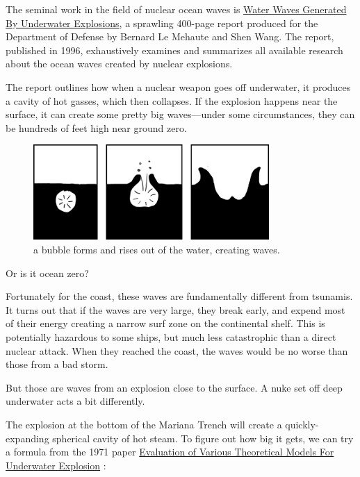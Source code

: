 {The seminal work in the field of nuclear ocean waves is \href{http://www.dtic.mil/cgi-bin/GetTRDoc?Location=U2&doc=GetTRDoc.pdf&AD=ADA304244}{Water Waves Generated By Underwater Explosions}, a sprawling 400-page report produced for the Department of Defense by Bernard Le Mehaute and Shen Wang. The report, published in 1996, exhaustively examines and summarizes all available research about the ocean waves created by nuclear explosions.}

{The report outlines how when a nuclear weapon goes off underwater, it produces a cavity of hot gasses, which then collapses. If the explosion happens near the surface, it can create some pretty big waves—under some circumstances, they can be hundreds of feet high near ground zero.}

\begin{figure}[!htbp]
\centering
\includegraphics[scale=0.5, max width=0.8\textwidth]{imgs/a/15/mariana_shallow.png}
\caption{a bubble forms and rises out of the water, creating waves.}
\end{figure}

{Or is it ocean zero?}

{Fortunately for the coast, these waves are fundamentally different from tsunamis. It turns out that if the waves are very large, they break early, and expend most of their energy creating a narrow surf zone on the continental shelf. This is potentially hazardous to some ships, but much less catastrophic than a direct nuclear attack. When they reached the coast, the waves would be no worse than those from a bad storm.}

{But those are waves from an explosion close to the surface. A nuke set off deep underwater acts a bit differently.}

{The explosion at the bottom of the Mariana Trench will create a quickly-expanding spherical cavity of hot steam. To figure out how big it gets, we can try a formula from the 1971 paper \href{http://www.dtic.mil/dtic/tr/fulltext/u2/737271.pdf}{Evaluation of Various Theoretical Models For Underwater Explosion} :}

